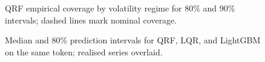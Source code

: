 \documentclass[
  a4paper,
  DIV=11,
  numbers=noendperiod]{scrreprt}
\begin{document}
\begin{figure}


\caption{\label{fig-qrf-reliability-by-regime-bars}QRF empirical
coverage by volatility regime for 80\% and 90\% intervals; dashed lines
mark nominal coverage.}

\end{figure}%

\begin{figure}


\caption{\label{fig-compare-80preds}Median and 80\% prediction intervals
for QRF, LQR, and LightGBM on the same token; realised series overlaid.}

\end{figure}%
\end{document}
